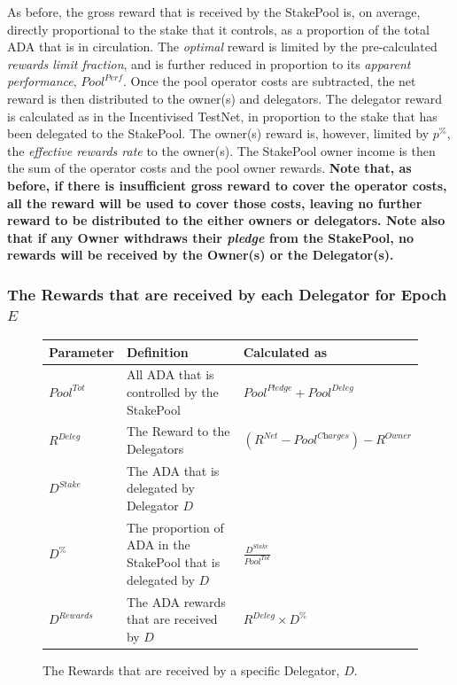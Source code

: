 \documentclass[11pt,a4paper,dvipsnames,twosided,final]{article}
\newcommand{\ada}{ADA{}}
\begin{document}
\noindent
As before, the gross reward that is received by the StakePool is, on average, directly proportional to the
stake that it controls, as a proportion of the total \ada{} that is in circulation.
The \emph{optimal} reward is limited by the pre-calculated \emph{rewards limit fraction}, and is further reduced in
proportion to its \emph{apparent performance}, $\textit{Pool}^{\textit{Perf}}$.
Once the pool operator costs are subtracted,
the net reward is then distributed to the owner(s) and delegators.
The delegator reward is calculated as in the Incentivised TestNet, in proportion to the stake that has
been delegated to the StakePool.
The owner(s) reward is, however, limited by $p^\%$, the \emph{effective rewards rate} to the owner(s).
%
The StakePool owner income is then the sum of the operator costs and the pool owner rewards.
\textbf{Note that, as before, if there is insufficient gross reward to cover the operator costs, all the reward will be used to cover those
costs, leaving no further reward to be distributed to the either owners or delegators.
Note also that if any Owner withdraws their \emph{pledge} from the StakePool, no rewards will be received by the Owner(s) or the Delegator(s).}

\clearpage
\subsubsection*{The Rewards that are received by each Delegator for Epoch $E$}

\begin{figure}[h!]
\begin{center}
\begin{tabular}{||l|p{9cm}|l||}
  \hline \hline
\textbf{Parameter} & \textbf{Definition} & \textbf{Calculated as} \\\hline
${\textit{Pool}}^{Tot}$ & All \ada{} that is controlled by the StakePool & ${\textit{Pool}}^\textit{Pledge} + {\textit{Pool}}^\textit{Deleg}$ \\\hline
$R^{Deleg}$ & The Reward to the Delegators & $(R^{\textit{Net}}-\textit{Pool}^{\textit{Charges}}) - R^{Owner}$ \\\hline
$D^{Stake}$ & The \ada{} that is delegated by Delegator $D$ & \\\hline
$D^\%$ & The proportion of \ada{} in the StakePool that is delegated by $D$ & $\frac{D^{Stake}}{Pool^{Tot}}$ \\\hline
$D^{Rewards}$ & The \ada{} rewards that are received by $D$ & $R^{\textit{Deleg}} \times D^\%$ \\\hline
\hline
\end{tabular}
\end{center}
\caption{The Rewards that are received by a specific Delegator, $D$.}
\end{figure}
\end{document}
